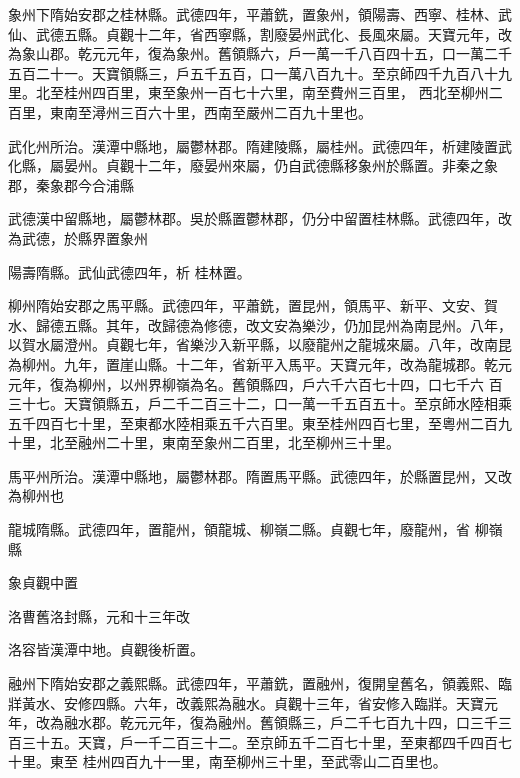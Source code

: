 \begin{pinyinscope}
 象州下隋始安郡之桂林縣。武德四年，平蕭銑，置象州，領陽壽、西寧、桂林、武仙、武德五縣。貞觀十二年，省西寧縣，割廢晏州武化、長風來屬。天寶元年，改為象山郡。乾元元年，復為象州。舊領縣六，戶一萬一千八百四十五，口一萬二千五百二十一。天寶領縣三，戶五千五百，口一萬八百九十。至京師四千九百八十九里。北至桂州四百里，東至象州一百七十六里，南至費州三百里，
 西北至柳州二百里，東南至潯州三百六十里，西南至嚴州二百九十里也。



 武化州所治。漢潭中縣地，屬鬱林郡。隋建陵縣，屬桂州。武德四年，析建陵置武化縣，屬晏州。貞觀十二年，廢晏州來屬，仍自武德縣移象州於縣置。非秦之象郡，秦象郡今合浦縣



 武德漢中留縣地，屬鬱林郡。吳於縣置鬱林郡，仍分中留置桂林縣。武德四年，改為武德，於縣界置象州



 陽壽隋縣。武仙武德四年，析
 桂林置。



 柳州隋始安郡之馬平縣。武德四年，平蕭銑，置昆州，領馬平、新平、文安、賀水、歸德五縣。其年，改歸德為修德，改文安為樂沙，仍加昆州為南昆州。八年，以賀水屬澄州。貞觀七年，省樂沙入新平縣，以廢龍州之龍城來屬。八年，改南昆為柳州。九年，置崖山縣。十二年，省新平入馬平。天寶元年，改為龍城郡。乾元元年，復為柳州，以州界柳嶺為名。舊領縣四，戶六千六百七十四，口七千六
 百三十七。天寶領縣五，戶二千二百三十二，口一萬一千五百五十。至京師水陸相乘五千四百七十里，至東都水陸相乘五千六百里。東至桂州四百七里，至粵州二百九十里，北至融州二十里，東南至象州二百里，北至柳州三十里。



 馬平州所治。漢潭中縣地，屬鬱林郡。隋置馬平縣。武德四年，於縣置昆州，又改為柳州也



 龍城隋縣。武德四年，置龍州，領龍城、柳嶺二縣。貞觀七年，廢龍州，省
 柳嶺縣



 象貞觀中置



 洛曹舊洛封縣，元和十三年改



 洛容皆漢潭中地。貞觀後析置。



 融州下隋始安郡之義熙縣。武德四年，平蕭銑，置融州，復開皇舊名，領義熙、臨牂黃水、安修四縣。六年，改義熙為融水。貞觀十三年，省安修入臨牂。天寶元年，改為融水郡。乾元元年，復為融州。舊領縣三，戶二千七百九十四，口三千三百三十五。天寶，戶一千二百三十二。至京師五千二百七十里，至東都四千四百七十里。東至
 桂州四百九十一里，南至柳州三十里，至武零山二百里也。




\end{pinyinscope}
